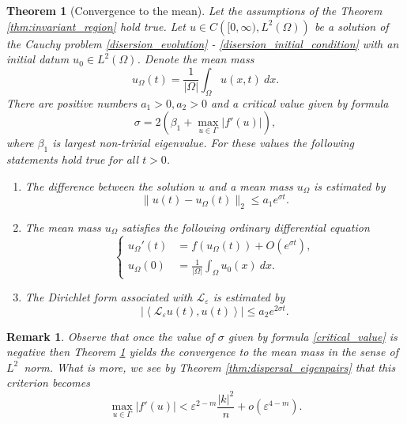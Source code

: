 \documentclass[12pt, a4paper]{article}
\makeatletter
\theoremstyle{break}
\newtheorem{thm}{Theorem}[section]
\theoremstyle{break}
\theoremstyle{break}
\newtheorem{rem}{Remark}[section]
\theoremstyle{break}
\theoremstyle{break}
\newcommand{\mylabel}[2]{#2\def\@currentlabel{#2}\label{#1}}
\newcommand{\Leo}{\mathcal{L}_{\varepsilon}}
\newcommand{\Leb}{L^2\left(\Omega\right)}
\makeatother
\begin{document}
\begin{thm}[Convergence to the mean]
    Let the assumptions of the Theorem \ref{thm:invariant_region} hold true.
    Let $u \in C\left([0, \infty), \Leb\right)$ be a solution of the Cauchy problem \eqref{disersion_evolution} - \eqref{disersion_initial_condition} with an initial datum $u_0 \in L^2\left(\Omega\right)$. Denote the mean mass
    \begin{equation*}
        u_\Omega(t) = \frac{1}{|\Omega|}\int_\Omega u(x,t)\:dx.
    \end{equation*}There are positive numbers $a_1 > 0, a_2 >0$ and a critical value given by formula
    \begin{equation}
        \sigma = 2(\beta_1 + \max_{u \in \Gamma}|f'(u)|),
        \label{critical_value}
    \end{equation}
    where $\beta_1$ is largest non-trivial eigenvalue. For these values the following statements hold true for all $t > 0$.
    \begin{enumerate}[label=\textnormal{(\arabic*)}]
        \item [\mylabel{thm:conv_i}{(i)}] The difference between the solution $u$ and a mean mass $u_\Omega$ is estimated by
        \begin{equation}
            \| u(t) - u_{\Omega}(t) \|_{2} \leq a_1 e^{\sigma t}.
        \end{equation}
        \item [\mylabel{thm:conv_ii}{(ii)}] The mean mass $u_\Omega$ satisfies the following ordinary differential equation
        \begin{equation}
            \begin{cases}
                u_\Omega'(t) &= f(u_\Omega(t)) + O(e^{\sigma t}), \\
                u_\Omega(0) &= \frac{1}{|\Omega|}\int_\Omega u_0(x)\: dx.
            \end{cases}
        \end{equation}
        \item [\mylabel{thm:conv_iii}{(iii)}] The Dirichlet form associated with $\Leo$ is estimated by
        \begin{equation}
            |\left\langle \Leo u(t), u(t) \right\rangle| \leq a_2 e^{2\sigma t}.
        \end{equation}
    \end{enumerate}
    \label{thm:convergence_to_mean_mass}
\end{thm}

\begin{rem}
    Observe that once the value of $\sigma$ given by formula \eqref{critical_value} is negative then Theorem \ref{thm:convergence_to_mean_mass} yields the convergence to the mean mass in the sense of $L^2$\ norm. What is more, we see by Theorem \ref{thm:dispersal_eigenpairs} that this criterion becomes
    \begin{equation*}
        \max_{u \in \Gamma} |f'(u)| < \varepsilon^{2-m} \frac{|k|^2}{n} + o(\varepsilon^{4-m}).
    \end{equation*}
\end{rem}
\end{document}
